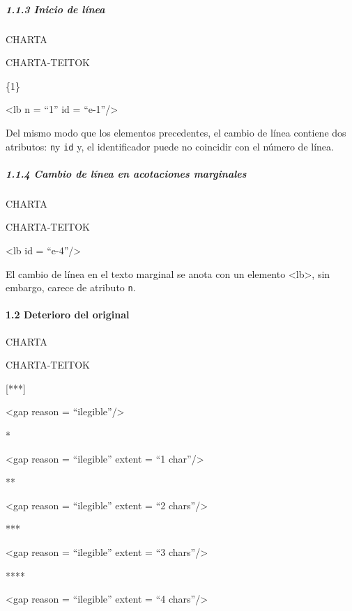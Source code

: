\documentclass[
]{book}
\begin{document}
\hypertarget{inicio-de-luxednea}{%
\subparagraph*{1.1.3 Inicio de línea}\label{inicio-de-luxednea}}

CHARTA

CHARTA-TEITOK

\{1\}

{\textless lb} {n} {=} {``1''} {id} {=} {``e-1''}{/\textgreater{}}

Del mismo modo que los elementos precedentes, el cambio de línea contiene dos atributos: \texttt{n}y \texttt{id} y, el identificador puede no coincidir con el número de línea.

\hypertarget{cambio-de-luxednea-en-acotaciones-marginales}{%
\subparagraph*{1.1.4 Cambio de línea en acotaciones marginales}\label{cambio-de-luxednea-en-acotaciones-marginales}}

CHARTA

CHARTA-TEITOK

\textbar{}

{\textless lb} {id} {=} {``e-4''}{/\textgreater{}}

El cambio de línea en el texto marginal se anota con un elemento { \textless lb\textgreater{}}, sin embargo, carece de atributo \texttt{n}.

\hypertarget{deterioro-del-original}{%
\paragraph*{1.2 Deterioro del original}\label{deterioro-del-original}}

CHARTA

CHARTA-TEITOK

{[}***{]}

{\textless gap} {reason} {=} {``ilegible''}{/\textgreater{}}

*

{\textless gap} {reason} {=} {``ilegible''} {extent} {=} {``1 char''}{/\textgreater{}}

**

{\textless gap} {reason} {=} {``ilegible''} {extent} {=} {``2 chars''}{/\textgreater{}}

***

{\textless gap} {reason} {=} {``ilegible''} {extent} {=} {``3 chars''}{/\textgreater{}}

****

{\textless gap} {reason} {=} {``ilegible''} {extent} {=} {``4 chars''}{/\textgreater{}}
\end{document}
